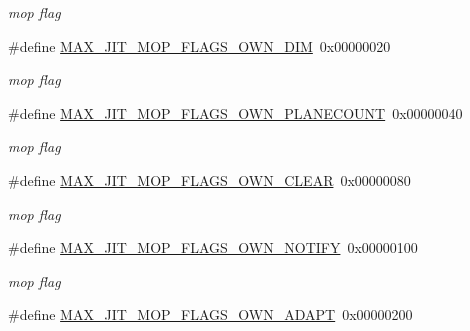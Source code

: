 \begin{DoxyCompactItemize}
\begin{DoxyCompactList}\small\item\em mop flag \item\end{DoxyCompactList}\item 
\hypertarget{group__jitter_gaf138ee8c3a7120b8914c2e815ed013bd}{
\#define \hyperlink{group__jitter_gaf138ee8c3a7120b8914c2e815ed013bd}{MAX\_\-JIT\_\-MOP\_\-FLAGS\_\-OWN\_\-DIM}~0x00000020}
\label{group__jitter_gaf138ee8c3a7120b8914c2e815ed013bd}

\begin{DoxyCompactList}\small\item\em mop flag \item\end{DoxyCompactList}\item 
\hypertarget{group__jitter_ga77553b6728bd9d5d6d18fe6e4d65a128}{
\#define \hyperlink{group__jitter_ga77553b6728bd9d5d6d18fe6e4d65a128}{MAX\_\-JIT\_\-MOP\_\-FLAGS\_\-OWN\_\-PLANECOUNT}~0x00000040}
\label{group__jitter_ga77553b6728bd9d5d6d18fe6e4d65a128}

\begin{DoxyCompactList}\small\item\em mop flag \item\end{DoxyCompactList}\item 
\hypertarget{group__jitter_gaadd7ebf9b850b06496bdeb9414d181e4}{
\#define \hyperlink{group__jitter_gaadd7ebf9b850b06496bdeb9414d181e4}{MAX\_\-JIT\_\-MOP\_\-FLAGS\_\-OWN\_\-CLEAR}~0x00000080}
\label{group__jitter_gaadd7ebf9b850b06496bdeb9414d181e4}

\begin{DoxyCompactList}\small\item\em mop flag \item\end{DoxyCompactList}\item 
\hypertarget{group__jitter_ga669c2f28bba1dfb4181ebae8f19488bc}{
\#define \hyperlink{group__jitter_ga669c2f28bba1dfb4181ebae8f19488bc}{MAX\_\-JIT\_\-MOP\_\-FLAGS\_\-OWN\_\-NOTIFY}~0x00000100}
\label{group__jitter_ga669c2f28bba1dfb4181ebae8f19488bc}

\begin{DoxyCompactList}\small\item\em mop flag \item\end{DoxyCompactList}\item 
\hypertarget{group__jitter_ga1c01c9fbad6e41293920117964654f61}{
\#define \hyperlink{group__jitter_ga1c01c9fbad6e41293920117964654f61}{MAX\_\-JIT\_\-MOP\_\-FLAGS\_\-OWN\_\-ADAPT}~0x00000200}
\label{group__jitter_ga1c01c9fbad6e41293920117964654f61}


\end{DoxyCompactItemize}

